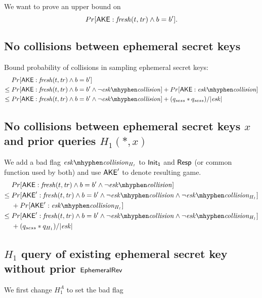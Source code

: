 \documentclass[]{article}
\begin{document}
We want to prove an upper bound on
\[
  Pr[\mathsf{AKE} : \mathit{fresh}(t, \mathit{tr}) \land b = b'].
\]

\newcommand{\eskColl}{\mathit{esk \mhyphen collision}}

\subsection{No collisions between ephemeral secret keys}

Bound probability of collisions in sampling ephemeral secret keys:
\begin{align*}
  & Pr[\Ake : \fresh(t, \tr) \land b = b'] \\
  \leq{}&   Pr[\Ake : \fresh(t, \tr) \land b = b' \land \neg \eskColl]
          + Pr[\Ake : \eskColl] \\
 \leq{}&   Pr[\Ake : \fresh(t, \tr) \land b = b' \land \neg \eskColl]
          + (q_{sess} * q_{sess}) / |\esk|
\end{align*}

\subsection{No collisions between ephemeral secret keys $x$ and prior queries $H_1(*,x)$}

\newcommand{\eskHColl}{\mathit{esk \mhyphen collision_{H_1}}}

We add a bad flag $\eskHColl$ to $\mathsf{Init_1}$ and $\mathsf{Resp}$ (or common function used by both)
  and use $\mathsf{AKE}'$ to denote resulting game.
\begin{align*}
 &   Pr[\Ake : \fresh(t, \tr) \land b = b' \land \neg \eskColl] \\
   \leq{}&   Pr[\Ake' : \fresh(t, \tr) \land b = b' \land \neg \eskColl \land \neg \eskHColl] \\
         & + Pr[\Ake' : \eskHColl] \\
   \leq{}&   Pr[\Ake' : \fresh(t, \tr) \land b = b' \land \neg \eskColl \land \neg \eskHColl] \\
         & + (q_{sess} * q_{H_1}) / |\esk|
\end{align*}


\subsection{$H_1$ query of existing ephemeral secret key without prior $\mathsf{EphemeralRev}$}

We first change $H_1^A$ to set the bad flag
\end{document}
